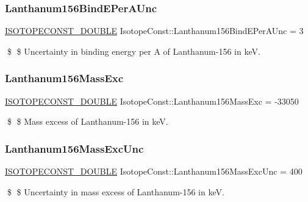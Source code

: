\subsubsection{\texorpdfstring{Lanthanum156\+Bind\+E\+Per\+A\+Unc}{Lanthanum156BindEPerAUnc}}
{\footnotesize\ttfamily \mbox{\hyperlink{group___isotope_const-_macros_ga8f45a7272ce02c0b4c65c44636ed719a}{I\+S\+O\+T\+O\+P\+E\+C\+O\+N\+S\+T\+\_\+\+D\+O\+U\+B\+LE}} Isotope\+Const\+::\+Lanthanum156\+Bind\+E\+Per\+A\+Unc = 3}

\$ \$ Uncertainty in binding energy per A of Lanthanum-\/156 in keV. \mbox{\label{group___isotope_const-_lanthanum-_la156_gaaa57af68ac40b6bb1aa0e6c84d35d1f6}} 
\subsubsection{\texorpdfstring{Lanthanum156\+Mass\+Exc}{Lanthanum156MassExc}}
{\footnotesize\ttfamily \mbox{\hyperlink{group___isotope_const-_macros_ga8f45a7272ce02c0b4c65c44636ed719a}{I\+S\+O\+T\+O\+P\+E\+C\+O\+N\+S\+T\+\_\+\+D\+O\+U\+B\+LE}} Isotope\+Const\+::\+Lanthanum156\+Mass\+Exc = -\/33050}

\$ \$ Mass excess of Lanthanum-\/156 in keV. \mbox{\label{group___isotope_const-_lanthanum-_la156_gaa4528d6327136a7e2fc1e7b590e4da6c}} 
\subsubsection{\texorpdfstring{Lanthanum156\+Mass\+Exc\+Unc}{Lanthanum156MassExcUnc}}
{\footnotesize\ttfamily \mbox{\hyperlink{group___isotope_const-_macros_ga8f45a7272ce02c0b4c65c44636ed719a}{I\+S\+O\+T\+O\+P\+E\+C\+O\+N\+S\+T\+\_\+\+D\+O\+U\+B\+LE}} Isotope\+Const\+::\+Lanthanum156\+Mass\+Exc\+Unc = 400}

\$ \$ Uncertainty in mass excess of Lanthanum-\/156 in keV. \mbox{\label{group___isotope_const-_lanthanum-_la156_ga9d9203bdacf6631773b13080eb435763}} 
